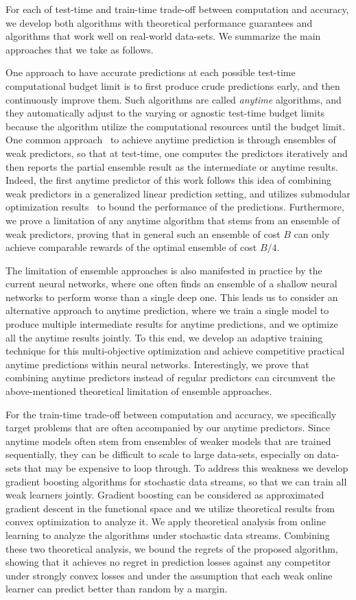 For each of test-time and train-time trade-off between computation and accuracy, we develop both algorithms with theoretical performance guarantees and algorithms that work well on real-world data-sets. We summarize the main approaches that we take as follows. 

One approach to have accurate predictions at each possible test-time computational budget limit is to first produce crude predictions early, and then continuously improve them. Such algorithms are called \emph{anytime} algorithms, and they automatically adjust to the varying or agnostic test-time budget limits because the algorithm utilize the computational resources until the budget limit. 
One common approach~\citep{speedboost} to achieve anytime prediction is through ensembles of weak predictors, so that at test-time, one computes the predictors iteratively and then reports the partial ensemble result as the intermediate or anytime results. Indeed, the first anytime predictor of this work follows this idea of combining weak predictors in a generalized linear prediction setting, and utilizes submodular optimization results~\citep{kemp} to bound the performance of the predictions. Furthermore, we prove a limitation of any anytime algorithm that stems from an ensemble of weak predictors, proving that in general such an ensemble of cost $B$ can only achieve comparable rewards of the optimal ensemble of cost $B/4$. 

The limitation of ensemble approaches is also manifested in practice by the current neural networks, where one often finds an ensemble of a shallow neural networks to perform worse than a single deep one. 
This leads us to consider an alternative approach to anytime prediction, where we train a single model to produce multiple intermediate results for anytime predictions, and we optimize all the anytime results jointly. To this end, we develop an adaptive training technique for this multi-objective optimization and achieve competitive practical anytime predictions within neural networks. Interestingly, we prove that combining anytime predictors instead of regular predictors can circumvent the above-mentioned theoretical limitation of ensemble approaches. 

For the train-time trade-off between computation and accuracy, we specifically target problems that are often accompanied by our anytime predictors. Since anytime models often stem from ensembles of weaker models that are trained sequentially, they can be difficult to scale to large data-sets, especially on data-sets that may be expensive to loop through. To address this weakness we develop gradient boosting algorithms for stochastic data streams, so that we can train all weak learners jointly. Gradient boosting can be considered as approximated gradient descent in the functional space and we utilize theoretical results from convex optimization to analyze it. We apply theoretical analysis from online learning to analyze the algorithms under stochastic data streams. Combining these two theoretical analysis, we bound the regrets of the proposed algorithm, showing that it achieves no regret in prediction losses against any competitor under strongly convex losses and under the assumption that each weak online learner can predict better than random by a margin.

